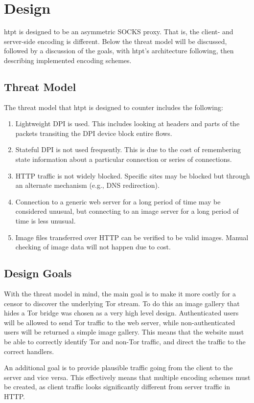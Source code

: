 \section{Design}
htpt is designed to be an asymmetric SOCKS proxy.  That is, the client- and server-side encoding is different. Below the threat model will be discussed, followed by a discussion of the goals, with htpt's architecture following, then describing implemented encoding schemes.

\subsection{Threat Model}
The threat model that htpt is designed to counter includes the following:
\begin{enumerate}
  \item Lightweight DPI is used. This includes looking at headers and parts of the packets transiting the DPI device block entire flows.
  \item Stateful DPI is not used frequently. This is due to the cost of remembering state information about a particular connection or series of connections.
  \item HTTP traffic is not widely blocked. Specific sites may be blocked but through an alternate mechanism (e.g., DNS redirection).
  \item Connection to a generic web server for a long period of time may be considered unusual, but connecting to an image server for a long period of time is less unusual.
  \item Image files transferred over HTTP can be verified to be valid images. Manual checking of image data will not happen due to cost.
\end{enumerate}

\subsection{Design Goals}
With the threat model in mind, the main goal is to make it more costly for a censor to discover the underlying Tor stream. To do this an image gallery that hides a Tor bridge was chosen as a very high level design. Authenticated users will be allowed to send Tor traffic to the web server, while non-authenticated users will be returned a simple image gallery. This means that the website must be able to correctly identify Tor and non-Tor traffic, and direct the traffic to the correct handlers. 

An additional goal is to provide plausible traffic going from the client to the server and vice versa. This effectively means that multiple encoding schemes must be created, as client traffic looks significantly different from server traffic in HTTP. 

